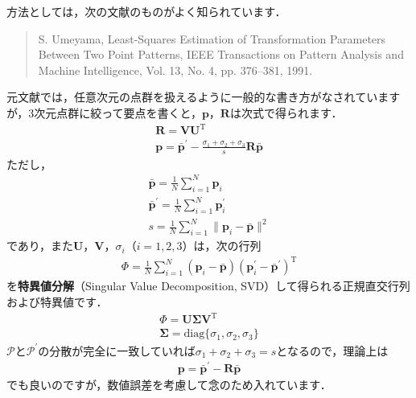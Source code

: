 ﻿\documentclass[a4paper]{jsarticle}
\begin{document}
方法としては，次の文献のものがよく知られています．
\begin{quote}
S. Umeyama, Least-Squares Estimation of Transformation Parameters Between Two Point Patterns, IEEE Transactions on Pattern Analysis and Machine Intelligence, Vol. 13, No. 4, pp. 376--381, 1991.
\end{quote}
元文献では，任意次元の点群を扱えるように一般的な書き方がなされていますが，3次元点群に絞って要点を書くと，$\boldsymbol{p}$，$\boldsymbol{R}$は次式で得られます．
\begin{align*}
\boldsymbol{R}=\boldsymbol{V}\boldsymbol{U}^{\mathrm{T}}
\\
\boldsymbol{p}=\bar{\boldsymbol{p}}^{\prime}-\frac{\sigma_{1}+\sigma_{2}+\sigma_{3}}{s}\boldsymbol{R}\bar{\boldsymbol{p}}
\end{align*}
ただし，
\begin{align*}
\bar{\boldsymbol{p}}=\frac{1}{N}\sum_{i=1}^{N}\boldsymbol{p}_{i}
\\
\bar{\boldsymbol{p}}^{\prime}=\frac{1}{N}\sum_{i=1}^{N}\boldsymbol{p}_{i}^{\prime}
\\
s=\frac{1}{N}\sum_{i=1}^{N}\|\boldsymbol{p}_{i}-\bar{\boldsymbol{p}}\|^{2}
\end{align*}
であり，また$\boldsymbol{U}$，$\boldsymbol{V}$，$\sigma_{i}$（$i=1,2,3$）は，次の行列
\begin{align*}
\boldsymbol{\varPhi}=\frac{1}{N}\sum_{i=1}^{N}(\boldsymbol{p}_{i}-\bar{\boldsymbol{p}})(\boldsymbol{p}_{i}^{\prime}-\bar{\boldsymbol{p}}^{\prime})^{\mathrm{T}}
\end{align*}
を{\bf 特異値分解}（Singular Value Decomposition, SVD）して得られる正規直交行列および特異値です．
\begin{align*}
\boldsymbol{\varPhi}=\boldsymbol{U}\boldsymbol{\Sigma}\boldsymbol{V}^{\mathrm{T}}
\\
\boldsymbol{\Sigma}=\mathrm{diag}\{\sigma_{1},\sigma_{2},\sigma_{3}\}
\end{align*}
$\mathcal{P}$と$\mathcal{P}^{\prime}$の分散が完全に一致していれば$\sigma_{1}+\sigma_{2}+\sigma_{3}=s$となるので，理論上は
\begin{align*}
\boldsymbol{p}=\bar{\boldsymbol{p}}^{\prime}-\boldsymbol{R}\bar{\boldsymbol{p}}
\end{align*}
でも良いのですが，数値誤差を考慮して念のため入れています．
\end{document}
